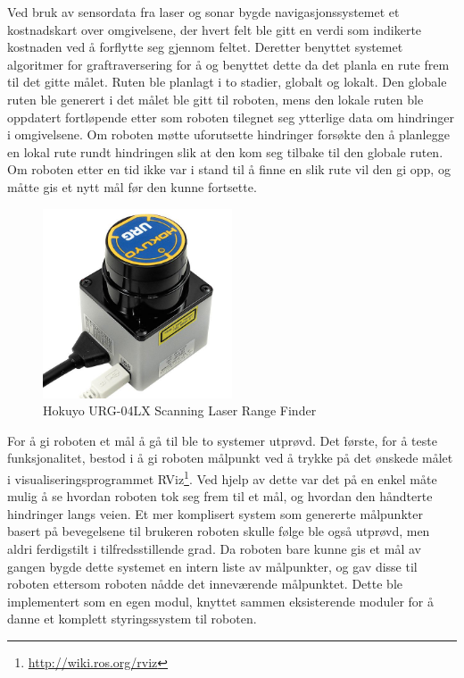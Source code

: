 Ved bruk av sensordata fra laser og sonar bygde navigasjonssystemet et kostnadskart over omgivelsene, der hvert felt ble gitt
en verdi som indikerte kostnaden ved å forflytte seg gjennom feltet. Deretter benyttet systemet algoritmer for graftraversering
for å og benyttet dette da det planla en rute
frem til det gitte målet. Ruten ble planlagt i to stadier, globalt og lokalt. Den globale ruten ble generert
i det målet ble gitt til roboten, mens den lokale ruten ble oppdatert fortløpende etter som roboten tilegnet
seg ytterlige data om hindringer i omgivelsene. Om roboten møtte uforutsette hindringer forsøkte den å planlegge
en lokal rute rundt hindringen slik at den kom seg tilbake til den globale ruten. Om roboten etter en tid ikke
var i stand til å finne en slik rute vil den gi opp, og måtte gis et nytt mål før den kunne fortsette.

\begin{figure}[!ht]
  \centering
  \includegraphics[width=0.5\textwidth]{gfx/hokuyo_urg_04lx.jpg}
  \caption[Hokuyo URG-04LX]{Hokuyo URG-04LX Scanning Laser Range Finder}
  \label{fig:hokuyo}
\end{figure}

For å gi roboten et mål å gå til ble to systemer utprøvd. Det første, for å teste funksjonalitet, bestod i å
gi roboten målpunkt ved å trykke på det ønskede målet i visualiseringsprogrammet RViz\footnote{\url{http://wiki.ros.org/rviz}}. Ved hjelp av dette var det på en enkel måte mulig å se hvordan
roboten tok seg frem til et mål, og hvordan den håndterte hindringer langs veien.
Et mer komplisert system som genererte målpunkter basert på bevegelsene til brukeren roboten skulle følge ble
også utprøvd, men aldri ferdigstilt i tilfredsstillende grad. Da
roboten bare kunne gis et mål av gangen bygde dette systemet en intern liste av målpunkter, og gav disse til
roboten ettersom roboten nådde det inneværende målpunktet. Dette ble implementert som en egen modul, knyttet sammen eksisterende moduler for å danne et komplett styringssystem til roboten.
